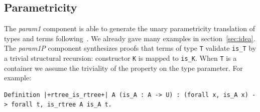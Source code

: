 \documentclass[a4paper,UKenglish,cleveref, autoref]{lipics-v2019}
\newcommand{\derive}[1]{\emph{#1}}
\begin{document}
% 
% 

\subsection{Parametricity} %

The \derive{param1} component is able to generate the unary
parametricity translation of types and terms
following~\cite{keller:hal-00730913}. We already gave many
examples in section~\ref{sec:idea}.
% 
% 
The \derive{param1P} component synthesizes proofs that terms
of type \lstinline+T+ validate \lstinline+is_T+ by a trivial
structural recursion: constructor \lstinline+K+ is mapped
to \lstinline+is_K+. When \lstinline+T+ is a container we
assume the triviality of the property on the type parameter.
For example:
\begin{lstlisting}
Definition |+rtree_is_rtree+| A (is_A : A -> U) : (forall x, is_A x) -> forall t, is_rtree A is_A t.
\end{lstlisting}

\end{document}
